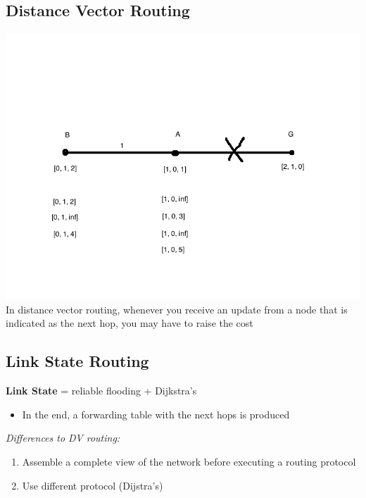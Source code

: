 \documentclass[11pt]{article}
\begin{document}
\subsection{Distance Vector Routing}
\label{sec:orgheadline86}
\includegraphics[width=.9\linewidth]{diagrams/fig9.png}
In distance vector routing, whenever you receive an update from a node
that is indicated as the next hop, you may have to raise the cost

\subsection{Link State Routing}
\label{sec:orgheadline89}
\textbf{Link State} = reliable flooding + Dijkstra's
\begin{itemize}
\item In the end, a forwarding table with the next hops is produced
\end{itemize}

\emph{Differences to DV routing:}
\begin{enumerate}
\item Assemble a complete view of the network before executing a routing
protocol
\item Use different protocol (Dijstra's)
\end{enumerate}
\end{document}
